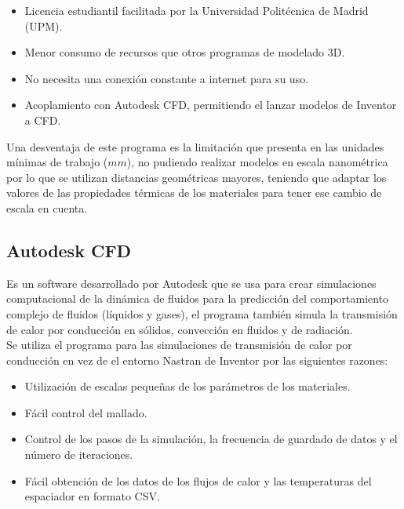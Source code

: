 \begin{itemize}
	\item Licencia estudiantil facilitada por la Universidad Politécnica de Madrid (UPM).
	\item Menor consumo de recursos que otros programas de modelado 3D.
	\item No necesita una conexión constante a internet para su uso.
	\item Acoplamiento con Autodesk CFD, permitiendo el lanzar modelos de Inventor a CFD. 
\end{itemize}
Una desventaja de este programa es la limitación que presenta en las unidades mínimas de trabajo ($mm$), no pudiendo realizar modelos en escala nanométrica por lo que se utilizan distancias geométricas mayores, teniendo que adaptar los valores de las propiedades térmicas de los materiales para tener ese cambio de escala en cuenta.
\subsection{Autodesk CFD}
Es un software desarrollado por Autodesk que se usa para crear simulaciones computacional de la dinámica de fluidos para la predicción del comportamiento complejo de fluidos (líquidos y gases), el programa también simula la transmisión de calor por conducción en sólidos, convección en fluidos y de radiación. \\
Se utiliza el programa para las simulaciones de transmisión de calor por conducción en vez de el entorno Nastran de Inventor por las siguientes razones:
\begin{itemize}
	\item Utilización de escalas pequeñas de los parámetros de los materiales.
	\item Fácil control del mallado.
	\item Control de los pasos de la simulación, la frecuencia de guardado de datos y el número de iteraciones.
	\item Fácil obtención de los datos de los flujos de calor y las temperaturas del espaciador en formato CSV.
\end{itemize}

